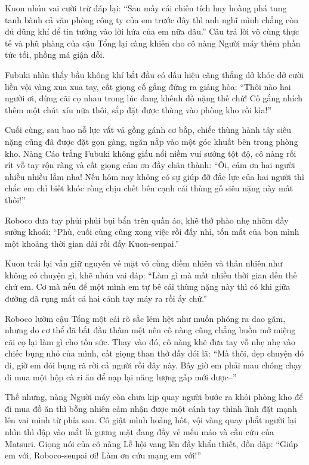 \documentclass[../main.tex]{subfiles}
\begin{document}
Kuon nhún vai cười trừ đáp lại: ``Sau mấy cái chiến tích huy hoàng phá tung tanh bành cả văn phòng công ty của em trước đây thì anh nghĩ mình chẳng còn đủ dũng khí để tin tưởng vào lời hứa của em nữa đâu.'' Câu trả lời vô cùng thực tế và phũ phàng của cậu Tổng lại càng khiến cho cô nàng Người máy thêm phần tức tối, phồng má giận dỗi.

Fubuki nhìn thấy bầu không khí bắt đầu có dấu hiệu căng thẳng dở khóc dở cười liền vội vàng xua xua tay, cất giọng cố gắng đứng ra giảng hòa: ``Thôi nào hai người ơi, đừng cãi cọ nhau trong lúc đang khênh đồ nặng thế chứ! Cố gắng nhích thêm một chút xíu nữa thôi, sắp đặt được thùng vào phòng kho rồi kìa!''

Cuối cùng, sau bao nỗ lực vất vả gồng gánh cơ bắp, chiếc thùng hành tây siêu nặng cũng đã được đặt gọn gàng, ngăn nắp vào một góc khuất bên trong phòng kho. Nàng Cáo trắng Fubuki không giấu nổi niềm vui sướng tột độ, cô nàng rối rít vỗ tay rộn ràng và cất giọng cảm ơn đầy chân thành: ``Ôi, cảm ơn hai người nhiều nhiều lắm nha! Nếu hôm nay không có sự giúp đỡ đắc lực của hai người thì chắc em chỉ biết khóc ròng chịu chết bên cạnh cái thùng gỗ siêu nặng này mất thôi!''

Roboco đưa tay phủi phủi bụi bẩn trên quần áo, khẽ thở phào nhẹ nhõm đầy sướng khoái: ``Phù, cuối cùng cũng xong việc rồi đấy nhỉ, tốn mất của bọn mình một khoảng thời gian dài rồi đấy Kuon-senpai.''

Kuon trái lại vẫn giữ nguyên vẻ mặt vô cùng điềm nhiên và thản nhiên như không có chuyện gì, khẽ nhún vai đáp: ``Làm gì mà mất nhiều thời gian đến thế chứ em. Cơ mà nếu để một mình em tự bê cái thùng nặng này thì có khi giữa đường đã rụng mất cả hai cánh tay máy ra rồi ấy chứ.''

Roboco lườm cậu Tổng một cái rõ sắc lẻm hệt như muốn phóng ra dao găm, nhưng do cơ thể đã bắt đầu thấm mệt nên cô nàng cũng chẳng buồn mở miệng cãi cọ lại làm gì cho tốn sức. Thay vào đó, cô nàng khẽ đưa tay vỗ nhẹ nhẹ vào chiếc bụng nhỏ của mình, cất giọng than thở đầy đói lã: ``Mà thôi, dẹp chuyện đó đi, giờ em đói bụng rã rời cả người rồi đây này. Bây giờ em phải mau chóng chạy đi mua một hộp cà ri ăn để nạp lại năng lượng gấp mới được--''

Thế nhưng, nàng Người máy còn chưa kịp quay người bước ra khỏi phòng kho để đi mua đồ ăn thì bỗng nhiên cảm nhận được một cánh tay thình lình đặt mạnh lên vai mình từ phía sau. Cô giật mình hoảng hốt, vội vàng quay phắt người lại nhìn thì đập vào mắt là gương mặt đang đầy vẻ mếu máo và cầu cứu của Matsuri. Giọng nói của cô nàng Lễ hội vang lên đầy khẩn thiết, dồn dập: ``Giúp em với, Roboco-senpai ơi! Làm ơn cứu mạng em với!''
\end{document}

